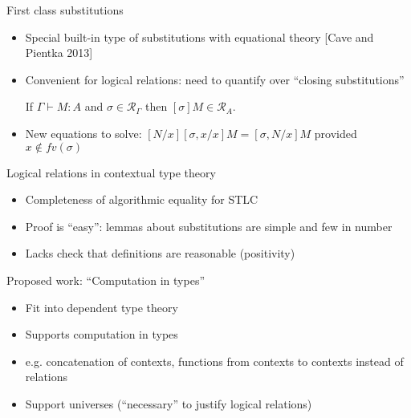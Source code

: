 \documentclass[usenames,dvipsnames]{beamer}
\begin{document}
\begin{frame}{First class substitutions}
\begin{itemize}
\item Special built-in type of substitutions with equational theory [Cave and Pientka 2013]
\item Convenient for logical relations: need to quantify over ``closing substitutions''
\begin{theorem}
If $\Gamma \vdash M : A$ {\color{purple} and $\sigma \in \mathcal{R}_\Gamma$} then
$[\sigma]M \in \mathcal{R}_A$.
\end{theorem}
\item New equations to solve: $[N/x][\sigma,x/x]M = [\sigma,N/x]M$ provided $x \not\in fv(\sigma)$
\end{itemize}
\end{frame}

\begin{frame}{Logical relations in contextual type theory}
\begin{itemize}
\item Completeness of algorithmic equality for STLC
\item Proof is ``easy'': lemmas about substitutions are simple and few in number
\item Lacks check that definitions are reasonable (positivity)
\end{itemize}
\end{frame}


\begin{frame}{Proposed work: ``Computation in types''}
\begin{itemize}
\item Fit into dependent type theory
\item Supports computation in types
\item e.g. concatenation of contexts, functions from contexts to contexts instead of relations
\item Support universes (``necessary'' to justify logical relations)
\end{itemize}
\end{frame}
\end{document}
